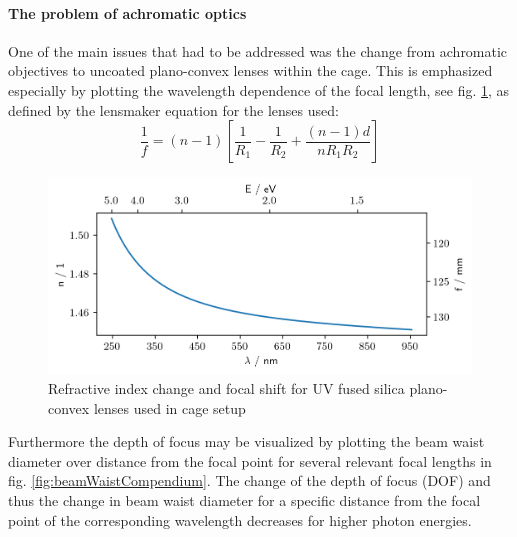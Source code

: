 \documentclass[twoside,openright]{scrreprt}
\begin{document}
\paragraph{The problem of achromatic optics}
One of the main issues that had to be addressed was the change from achromatic objectives to uncoated plano-convex lenses within the cage.
This is emphasized especially by plotting the wavelength dependence of the focal length, see fig. \ref{fig:ChromFocalShift}, as defined by the lensmaker equation for the lenses used:
\begin{equation}
\frac{1}{f} = (n-1) \left[\frac{1}{R_1} - \frac{1}{R_2} + \frac{(n-1)d}{n R_1 R_2}\right]
\end{equation}
\begin{figure}[h]
\centering
\includegraphics[scale = 0.5]{images/ChromaticFocalShiftandDispersionUVFS.png} 
\caption{Refractive index change and focal shift for UV fused silica plano-convex lenses used in cage setup\cite{Malitson:65}\label{fig:ChromFocalShift}}
\end{figure}

Furthermore the depth of focus may be visualized by plotting the beam waist diameter over distance from the focal point for several relevant focal lengths in fig. \ref{fig:beamWaistCompendium}. The change of the depth of focus (DOF) and thus the change in beam waist diameter for a specific distance from the focal point of the corresponding wavelength decreases for higher photon energies.
\end{document}
